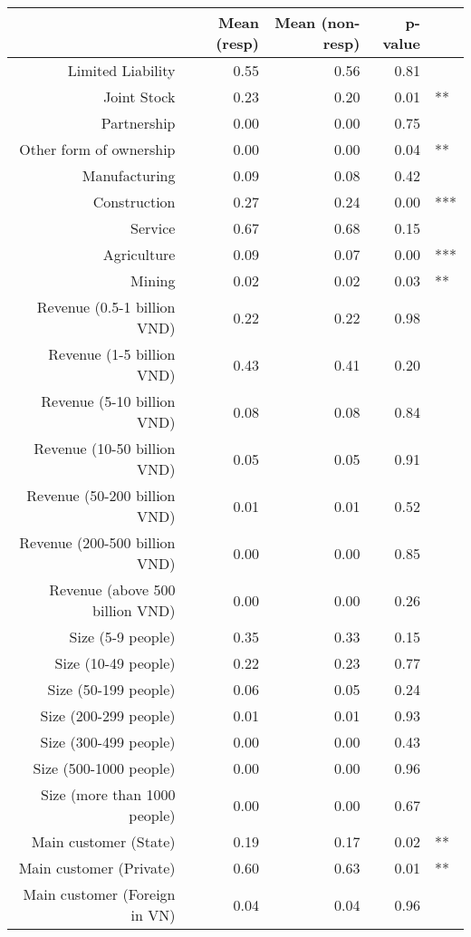 \begin{table}[ht]
\centering
\begin{tabular}{rrrrl}
  \hline
 & Mean (resp) & Mean (non-resp) & p-value &   \\ 
  \hline
Limited Liability & 0.55 & 0.56 & 0.81 &  \\ 
  Joint Stock & 0.23 & 0.20 & 0.01 & ** \\ 
  Partnership & 0.00 & 0.00 & 0.75 &  \\ 
  Other form of ownership & 0.00 & 0.00 & 0.04 & ** \\ 
  Manufacturing & 0.09 & 0.08 & 0.42 &  \\ 
  Construction & 0.27 & 0.24 & 0.00 & *** \\ 
  Service & 0.67 & 0.68 & 0.15 &  \\ 
  Agriculture & 0.09 & 0.07 & 0.00 & *** \\ 
  Mining & 0.02 & 0.02 & 0.03 & ** \\ 
  Revenue (0.5-1 billion VND) & 0.22 & 0.22 & 0.98 &  \\ 
  Revenue (1-5 billion VND) & 0.43 & 0.41 & 0.20 &  \\ 
  Revenue (5-10 billion VND) & 0.08 & 0.08 & 0.84 &  \\ 
  Revenue (10-50 billion VND) & 0.05 & 0.05 & 0.91 &  \\ 
  Revenue (50-200 billion VND) & 0.01 & 0.01 & 0.52 &  \\ 
  Revenue (200-500 billion VND) & 0.00 & 0.00 & 0.85 &  \\ 
  Revenue (above 500 billion VND) & 0.00 & 0.00 & 0.26 &  \\ 
  Size (5-9 people) & 0.35 & 0.33 & 0.15 &  \\ 
  Size (10-49 people) & 0.22 & 0.23 & 0.77 &  \\ 
  Size (50-199 people) & 0.06 & 0.05 & 0.24 &  \\ 
  Size (200-299 people) & 0.01 & 0.01 & 0.93 &  \\ 
  Size (300-499 people) & 0.00 & 0.00 & 0.43 &  \\ 
  Size (500-1000 people) & 0.00 & 0.00 & 0.96 &  \\ 
  Size (more than 1000 people) & 0.00 & 0.00 & 0.67 &  \\ 
  Main customer (State) & 0.19 & 0.17 & 0.02 & ** \\ 
  Main customer (Private) & 0.60 & 0.63 & 0.01 & ** \\ 
  Main customer (Foreign in VN) & 0.04 & 0.04 & 0.96 &  \\ 

\end{tabular}
\end{table}
